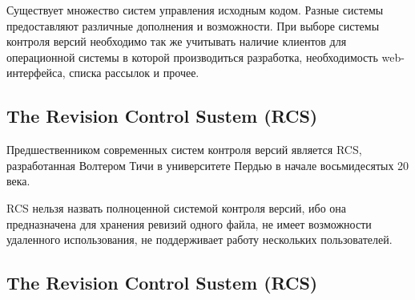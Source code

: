 Существует множество систем управления исходным кодом. Разные системы предоставляют различные дополнения и возможности. При выборе системы контроля версий необходимо так же учитывать наличие клиентов для операционной системы в которой производиться разработка, необходимость web-интерфейса, списка рассылок и прочее.

 \subsection{ The Revision Control Sustem (RCS) } \label{sect3_4_1}
 
 Предшественником современных систем контроля версий является RCS, разработанная Волтером Тичи в университете Пердью в начале восьмидесятых 20 века.
 
 RCS нельзя назвать полноценной системой контроля версий, ибо она предназначена для хранения ревизий одного файла, не имеет возможности удаленного использования, не поддерживает работу нескольких пользователей.
 
\subsection{ The Revision Control Sustem (RCS) } \label{sect3_4_1}
 
 
 

 



































\clearpage



